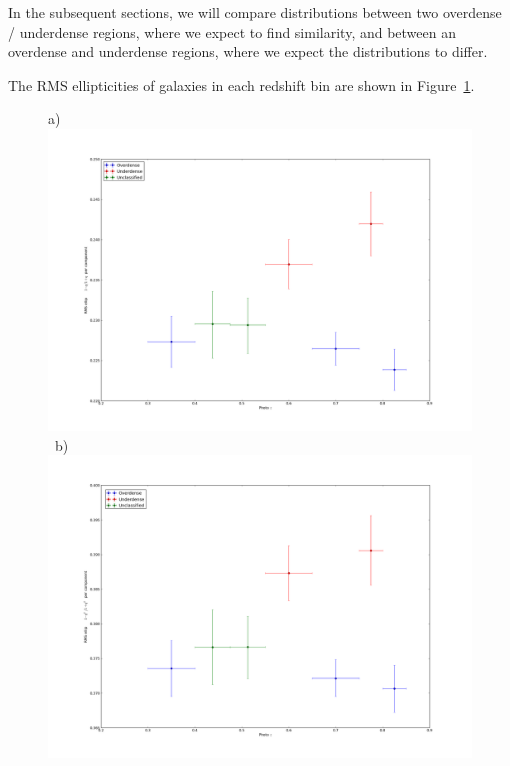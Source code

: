 \documentclass[twocolumn,useAMS,usenatbib]{mn2e}
\begin{document}
% 

In the subsequent sections, we will compare distributions between two overdense / underdense regions, where we expect to find similarity, and between an overdense and underdense regions,
where we expect the distributions to differ.

The RMS ellipticities of galaxies in each redshift bin are shown in Figure~\ref{fig:rms_ellip}.

\begin{figure}
 \centering
 a) \includegraphics[width=0.9\columnwidth]{rms_ellip1.png} \
 b) \includegraphics[width=0.9\columnwidth]{rms_ellip2.png} \\
 \label{fig:rms_ellip}
\end{figure}
\end{document}
